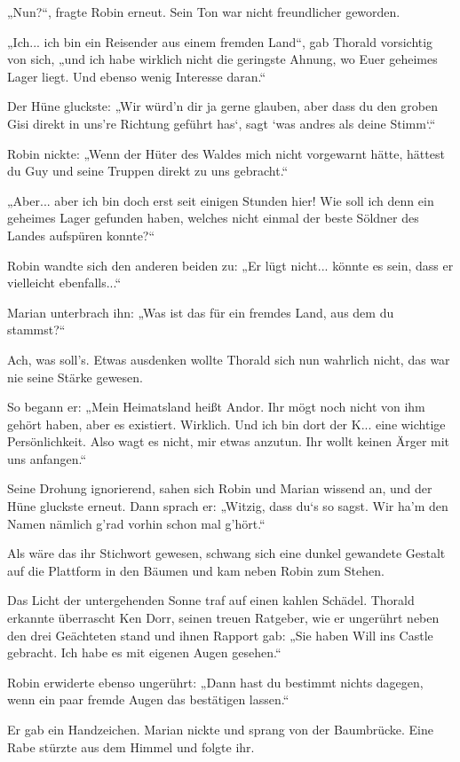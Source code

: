 \documentclass[10pt, a4paper, oneside]{book}
\begin{document}
„Nun?“, fragte Robin erneut. Sein Ton war nicht freundlicher geworden.

„Ich... ich bin ein Reisender aus einem fremden Land“, gab Thorald vorsichtig von sich, „und ich habe wirklich nicht die geringste Ahnung, wo Euer geheimes Lager liegt. Und ebenso wenig Interesse daran.“

Der Hüne gluckste: „Wir würd’n dir ja gerne glauben, aber dass du den groben Gisi direkt in uns’re Richtung geführt has‘, sagt ‘was andres als deine Stimm‘.“

Robin nickte: „Wenn der Hüter des Waldes mich nicht vorgewarnt hätte, hättest du Guy und seine Truppen direkt zu uns gebracht.“

„Aber... aber ich bin doch erst seit einigen Stunden hier! Wie soll ich denn ein geheimes Lager gefunden haben, welches nicht einmal der beste Söldner des Landes aufspüren konnte?“

Robin wandte sich den anderen beiden zu: „Er lügt nicht... könnte es sein, dass er vielleicht ebenfalls...“

Marian unterbrach ihn: „Was ist das für ein fremdes Land, aus dem du stammst?“

Ach, was soll’s. Etwas ausdenken wollte Thorald sich nun wahrlich nicht, das war nie seine Stärke gewesen.

So begann er: „Mein Heimatsland heißt Andor. Ihr mögt noch nicht von ihm gehört haben, aber es existiert. Wirklich. Und ich bin dort der K... eine wichtige Persönlichkeit. Also wagt es nicht, mir etwas anzutun. Ihr wollt keinen Ärger mit uns anfangen.“

Seine Drohung ignorierend, sahen sich Robin und Marian wissend an, und der Hüne gluckste erneut. Dann sprach er: „Witzig, dass du‘s so sagst. Wir ha’m den Namen nämlich g’rad vorhin schon mal g’hört.“

Als wäre das ihr Stichwort gewesen, schwang sich eine dunkel gewandete Gestalt auf die Plattform in den Bäumen und kam neben Robin zum Stehen.

Das Licht der untergehenden Sonne traf auf einen kahlen Schädel. Thorald erkannte überrascht Ken Dorr, seinen treuen Ratgeber, wie er ungerührt neben den drei Geächteten stand und ihnen Rapport gab: „Sie haben Will ins Castle gebracht. Ich habe es mit eigenen Augen gesehen.“

Robin erwiderte ebenso ungerührt: „Dann hast du bestimmt nichts dagegen, wenn ein paar fremde Augen das bestätigen lassen.“

Er gab ein Handzeichen. Marian nickte und sprang von der Baumbrücke. Eine Rabe stürzte aus dem Himmel und folgte ihr.
\end{document}
